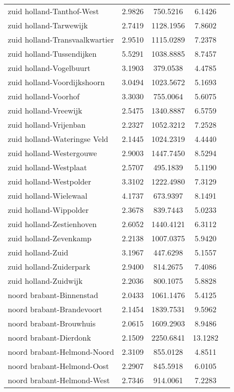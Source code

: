 \begin{longtable}{llccc}
zuid holland-Tanthof-West & 2.9826 & 750.5216 & 6.1426 \\
zuid holland-Tarwewijk & 2.7419 & 1128.1956 & 7.8602 \\
zuid holland-Transvaalkwartier & 2.9510 & 1115.0289 & 7.2378 \\
zuid holland-Tussendijken & 5.5291 & 1038.8885 & 8.7457 \\
zuid holland-Vogelbuurt & 3.1903 & 379.0538 & 4.4785 \\
zuid holland-Voordijkshoorn & 3.0494 & 1023.5672 & 5.1693 \\
zuid holland-Voorhof & 3.3030 & 755.0064 & 5.6075 \\
zuid holland-Vreewijk & 2.5475 & 1340.8887 & 6.5759 \\
zuid holland-Vrijenban & 2.2327 & 1052.3212 & 7.2528 \\
zuid holland-Wateringse Veld & 2.1445 & 1024.2319 & 4.4440 \\
zuid holland-Westergouwe & 2.9003 & 1447.7450 & 8.5294 \\
zuid holland-Westplaat & 2.5707 & 495.1839 & 5.1190 \\
zuid holland-Westpolder & 3.3102 & 1222.4980 & 7.3129 \\
zuid holland-Wielewaal & 4.1737 & 673.9397 & 8.1491 \\
zuid holland-Wippolder & 2.3678 & 839.7443 & 5.0233 \\
zuid holland-Zestienhoven & 2.6052 & 1440.4121 & 6.3112 \\
zuid holland-Zevenkamp & 2.2138 & 1007.0375 & 5.9420 \\
zuid holland-Zuid & 3.1967 & 447.6298 & 5.1557 \\
zuid holland-Zuiderpark & 2.9400 & 814.2675 & 7.4086 \\
zuid holland-Zuidwijk & 2.2036 & 800.1075 & 5.8828 \\
noord brabant-Binnenstad & 2.0433 & 1061.1476 & 5.4125 \\
noord brabant-Brandevoort & 2.1454 & 1839.7531 & 9.5962 \\
noord brabant-Brouwhuis & 2.0615 & 1609.2903 & 8.9486 \\
noord brabant-Dierdonk & 2.1509 & 2250.6841 & 13.1282 \\
noord brabant-Helmond-Noord & 2.3109 & 855.0128 & 4.8511 \\
noord brabant-Helmond-Oost & 2.2907 & 845.5918 & 6.0105 \\
noord brabant-Helmond-West & 2.7346 & 914.0061 & 7.2283 \\

\end{longtable}
